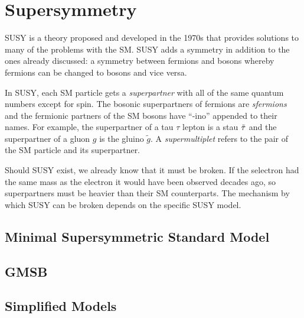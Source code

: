 \section{Supersymmetry}

\acf{SUSY} is a theory proposed and developed in the 1970s \cite{susy-found-1,susy-found-2,susy-found-3} that provides solutions to many of the problems with the \ac{SM}. \ac{SUSY} adds a symmetry in addition to the ones already discussed: a symmetry between fermions and bosons whereby fermions can be changed to bosons and vice versa. 

In \ac{SUSY}, each \ac{SM} particle gets a \emph{superpartner} with all of the same quantum numbers except for spin. The bosonic superpartners of fermions are \emph{sfermions} and the fermionic partners of the \ac{SM} bosons have ``-ino'' appended to their names. For example, the superpartner of a tau $\tau$ lepton is a stau $\tilde{\tau}$ and the superpartner of a gluon $g$ is the gluino $\tilde{g}$. A \emph{supermultiplet} refers to the pair of the \ac{SM} particle and its superpartner.

Should \ac{SUSY} exist, we already know that it must be broken. If the selectron had the same mass as the electron it would have been observed decades ago, so superpartners must be heavier than their \ac{SM} counterparts. The mechanism by which \ac{SUSY} can be broken depends on the specific \ac{SUSY} model.

\subsection{Minimal Supersymmetric Standard Model}

\subsection{GMSB}

\subsection{Simplified Models}




